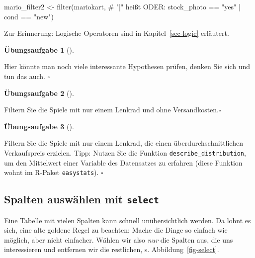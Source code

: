 \documentclass[
  a4paper,
]{scrbook}
\newenvironment{Shaded}{\begin{snugshade}}{\end{snugshade}}
\newcommand{\CommentTok}[1]{\textcolor[rgb]{0.37,0.37,0.37}{#1}}
\newcommand{\FunctionTok}[1]{\textcolor[rgb]{0.28,0.35,0.67}{#1}}
\newcommand{\NormalTok}[1]{\textcolor[rgb]{0.00,0.23,0.31}{#1}}
\newcommand{\OtherTok}[1]{\textcolor[rgb]{0.00,0.23,0.31}{#1}}
\newcommand{\SpecialCharTok}[1]{\textcolor[rgb]{0.37,0.37,0.37}{#1}}
\newcommand{\StringTok}[1]{\textcolor[rgb]{0.13,0.47,0.30}{#1}}
\theoremstyle{definition}
\theoremstyle{definition}
\theoremstyle{definition}
\newtheorem{exercise}{Übungsaufgabe}[chapter]
\theoremstyle{remark}
\begin{document}
\begin{Shaded}
\begin{Highlighting}[]
\NormalTok{mario\_filter2 }\OtherTok{\textless{}{-}} 
  \FunctionTok{filter}\NormalTok{(mariokart,  }\CommentTok{\# "|" heißt ODER:}
\NormalTok{         stock\_photo }\SpecialCharTok{==} \StringTok{"yes"} \SpecialCharTok{|}\NormalTok{ cond }\SpecialCharTok{==} \StringTok{"new"}\NormalTok{)}
\end{Highlighting}
\end{Shaded}

Zur Erinnerung: Logische Operatoren sind in Kapitel~\ref{sec-logic}
erläutert.

\begin{exercise}[]\protect\hypertarget{exr-hyps-filter}{}\label{exr-hyps-filter}

Hier könnte man noch viele interessante Hypothesen prüfen, denken Sie
sich und tun das auch. \(\square\)

\end{exercise}

\begin{exercise}[]\protect\hypertarget{exr-filter2}{}\label{exr-filter2}

Filtern Sie die Spiele mit nur einem Lenkrad und ohne
Versandkosten.\(\square\)

\end{exercise}

\begin{exercise}[]\protect\hypertarget{exr-filter3}{}\label{exr-filter3}

Filtern Sie die Spiele mit nur einem Lenkrad, die einen
überdurchschnittlichen Verkaufspreis erzielen. Tipp: Nutzen Sie die
Funktion \texttt{describe\_distribution}, um den Mittelwert einer
Variable des Datensatzes zu erfahren (diese Funktion wohnt im R-Paket
\texttt{easystats}). \(\square\)

\end{exercise}

\subsection{\texorpdfstring{Spalten auswählen mit
\texttt{select}}{Spalten auswählen mit select}}\label{spalten-auswuxe4hlen-mit-select}

Eine Tabelle mit vielen Spalten kann schnell unübersichtlich werden. Da
lohnt es sich, eine alte goldene Regel zu beachten: Mache die Dinge so
einfach wie möglich, aber nicht einfacher. Wählen wir also \emph{nur}
die Spalten aus, die uns interessieren und entfernen wir die restlichen,
s. Abbildung~\ref{fig-select}.
\end{document}
